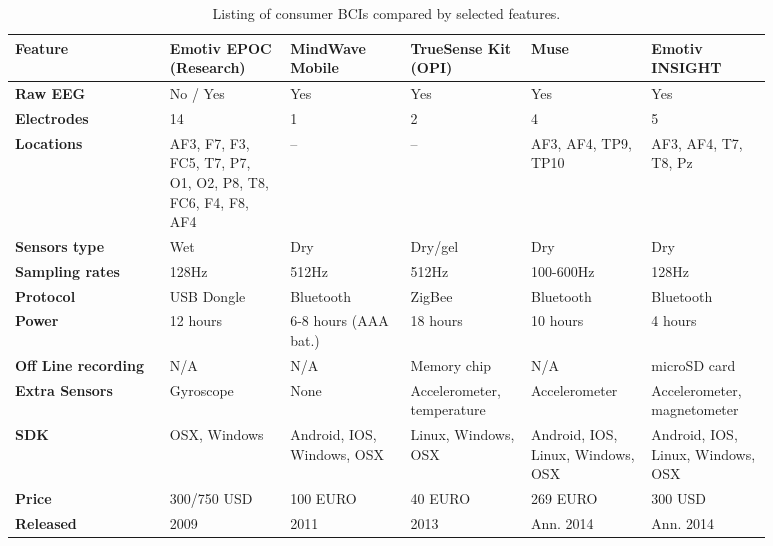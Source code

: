 \documentclass[a4paper,10pt,english,lof,lot,twoside]{puthesis}
\begin{document}
\begin{table}
\capstart
\begin{center}

\bodyspacing

\begin{tabular}{>{\raggedright\arraybackslash}p{0.18\linewidth} p{0.14\linewidth} p{0.14\linewidth} p{0.14\linewidth} p{0.14\linewidth} p{0.14\linewidth}}

\toprule
\textsf{\relax 
Feature
} & \textsf{\relax 
Emotiv EPOC (Research)
} & \textsf{\relax 
MindWave Mobile
} & \textsf{\relax 
TrueSense Kit (OPI)
} & \textsf{\relax 
Muse
} & \textsf{\relax 
Emotiv INSIGHT
}\\
\hline\midrule

\textbf{Raw EEG}
 & 
No / Yes
 & 
Yes
 & 
Yes
 & 
Yes
 & 
Yes
\\

\textbf{Electrodes}
 & 
14
 & 
1
 & 
2
 & 
4
 & 
5
\\

\textbf{Locations}
 & 
AF3, F7, F3, FC5, T7,
P7, O1, O2, P8, T8,
FC6, F4, F8, AF4
 & 
--
 & 
--
 & 
AF3, AF4, TP9, TP10
 & 
AF3, AF4, T7, T8, Pz
\\

\textbf{Sensors type}
 & 
Wet
 & 
Dry
 & 
Dry/gel
 & 
Dry
 & 
Dry
\\

\textbf{Sampling rates}
 & 
128Hz
 & 
512Hz
 & 
512Hz
 & 
100-600Hz
 & 
128Hz
\\

\textbf{Protocol}
 & 
USB Dongle
 & 
Bluetooth
 & 
ZigBee
 & 
Bluetooth
 & 
Bluetooth
\\

\textbf{Power}
 & 
12 hours
 & 
6-8 hours (AAA bat.)
 & 
18 hours
 & 
10 hours
 & 
4 hours
\\

\textbf{Off Line recording}
 & 
N/A
 & 
N/A
 & 
Memory chip
 & 
N/A
 & 
microSD card
\\

\textbf{Extra Sensors}
 & 
Gyroscope
 & 
None
 & 
Accelerometer,
temperature
 & 
Accelerometer
 & 
Accelerometer,
magnetometer
\\

\textbf{SDK}
 & 
OSX, Windows
 & 
Android, IOS, Windows,
OSX
 & 
Linux, Windows, OSX
 & 
Android, IOS, Linux,
Windows, OSX
 & 
Android, IOS, Linux,
Windows, OSX
\\

\textbf{Price}
 & 
300/750 USD
 & 
100 EURO
 & 
40 EURO
 & 
269 EURO
 & 
300 USD
\\

\textbf{Released}
 & 
2009
 & 
2011
 & 
2013
 & 
Ann. 2014
 & 
Ann. 2014
\\
\hline\bottomrule

\end{tabular}
\caption[Listing of consumer BCIs compared by selected features]{Listing of consumer BCIs compared by selected features.}\label{ch-background/index:table-consumer-bcis}
\end{center}
\end{table}
\end{document}

